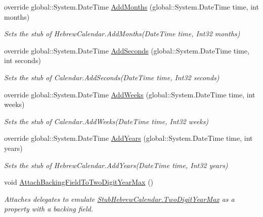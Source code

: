 \begin{DoxyCompactItemize}
override global\-::\-System.\-Date\-Time \hyperlink{class_system_1_1_globalization_1_1_fakes_1_1_stub_hebrew_calendar_ae6b557d91ecea4113699ca46a1eb679c}{Add\-Months} (global\-::\-System.\-Date\-Time time, int months)
\begin{DoxyCompactList}\small\item\em Sets the stub of Hebrew\-Calendar.\-Add\-Months(\-Date\-Time time, Int32 months)\end{DoxyCompactList}\item 
override global\-::\-System.\-Date\-Time \hyperlink{class_system_1_1_globalization_1_1_fakes_1_1_stub_hebrew_calendar_a8ee04c885a1d4774d49fa6476fcfaebb}{Add\-Seconds} (global\-::\-System.\-Date\-Time time, int seconds)
\begin{DoxyCompactList}\small\item\em Sets the stub of Calendar.\-Add\-Seconds(\-Date\-Time time, Int32 seconds)\end{DoxyCompactList}\item 
override global\-::\-System.\-Date\-Time \hyperlink{class_system_1_1_globalization_1_1_fakes_1_1_stub_hebrew_calendar_a52e62f4939eb4fc3b8195b29df121437}{Add\-Weeks} (global\-::\-System.\-Date\-Time time, int weeks)
\begin{DoxyCompactList}\small\item\em Sets the stub of Calendar.\-Add\-Weeks(\-Date\-Time time, Int32 weeks)\end{DoxyCompactList}\item 
override global\-::\-System.\-Date\-Time \hyperlink{class_system_1_1_globalization_1_1_fakes_1_1_stub_hebrew_calendar_a41988dd096f99976cf1d3e0b31d459e2}{Add\-Years} (global\-::\-System.\-Date\-Time time, int years)
\begin{DoxyCompactList}\small\item\em Sets the stub of Hebrew\-Calendar.\-Add\-Years(\-Date\-Time time, Int32 years)\end{DoxyCompactList}\item 
void \hyperlink{class_system_1_1_globalization_1_1_fakes_1_1_stub_hebrew_calendar_a638eca7f2db1983d3e901239b7241783}{Attach\-Backing\-Field\-To\-Two\-Digit\-Year\-Max} ()
\begin{DoxyCompactList}\small\item\em Attaches delegates to emulate \hyperlink{class_system_1_1_globalization_1_1_fakes_1_1_stub_hebrew_calendar_ad5f9d2b5d302daff8a712ac6a4231d67}{Stub\-Hebrew\-Calendar.\-Two\-Digit\-Year\-Max} as a property with a backing field.\end{DoxyCompactList}\item 

\end{DoxyCompactItemize}
